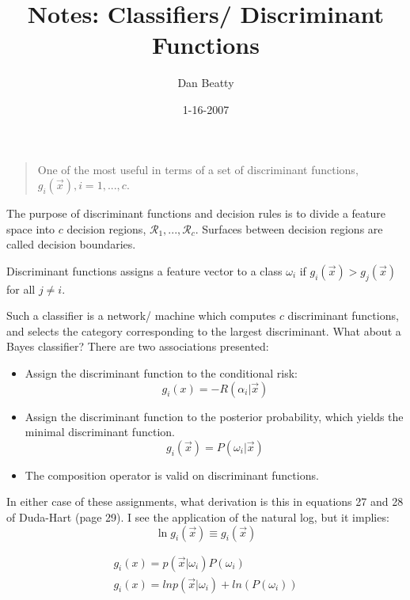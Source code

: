 \documentclass[11pt]{article}
\title{Notes: Classifiers/ Discriminant Functions }
\author{Dan Beatty}
\begin{document}
\maketitle

\date{1-16-2007}


\begin{quote}
One of the most useful in terms of a set of discriminant functions, $g_i(\vec{x}) , i = 1,...,c$.
\end{quote}
The purpose of discriminant functions and decision rules is to divide a feature space into $c$ decision regions, $\mathcal{R}_1,..., \mathcal{R}_c$.  Surfaces between decision regions are called decision boundaries.  

Discriminant functions assigns a feature vector to a class $\omega_i$ if $g_i (\vec{x}) > g_j (\vec{x})$ for all $j \neq i$.

Such a classifier is a network/ machine which computes $c$ discriminant functions, and selects the category corresponding to the largest discriminant.  What about a Bayes classifier?  There are two associations presented:
\begin{itemize}
	\item Assign the discriminant function to the conditional risk:
	\[
	g_i (x) = - R(\alpha_i | \vec{x})
	\]
	\item Assign the discriminant function to the posterior probability, which yields the minimal discriminant function. 
	\[
	g_i (\vec{x}) = P(\omega_i | \vec{x})
	\]
	\item The composition operator is valid on discriminant functions.  
\end{itemize}
In either case of these assignments, what derivation is this in equations 27 and 28 of Duda-Hart (page 29).  I see the application of the natural log, but it implies:
\[
\ln g_i(\vec{x}) \equiv g_i (\vec{x})
\]

\begin{eqnarray}
	g_i(x) = p(\vec{x} | \omega_i) P(\omega_i) \label{discriminantFunctionUnscaled} \\
	g_i (x) = ln p(\vec{x} | \omega_i) + ln (P(\omega_i))  \label{LnDiscriminantFunctionUnscaled}
\end{eqnarray}
\end{document}
